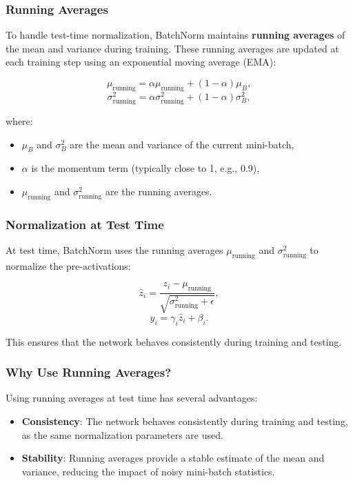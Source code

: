 \begin{notechapter}
\subsubsection{Running Averages}
To handle test-time normalization, BatchNorm maintains
\textbf{running averages}
of the mean and variance during training. These running averages are
updated at each training step using an exponential moving average (EMA):

\[
\mu_{\text{running}} = \alpha \mu_{\text{running}} + (1 - \alpha) \mu_B,
\]
\[
\sigma^2_{\text{running}} = \alpha \sigma^2_{\text{running}} + (1 - \alpha) \sigma_B^2,
\]

where:
\begin{itemize}
    \item \(\mu_B\) and \(\sigma_B^2\) are the mean and variance of the current mini-batch,
    \item \(\alpha\) is the momentum term (typically close to 1, e.g., 0.9),
    \item \(\mu_{\text{running}}\) and \(\sigma^2_{\text{running}}\) are the running averages.
\end{itemize}

\subsubsection{Normalization at Test Time}
At test time, BatchNorm uses the running averages \(\mu_{\text{running}}\) and
\(\sigma^2_{\text{running}}\) to normalize the pre-activations:

\[
\hat{z}_i = \frac{z_i - \mu_{\text{running}}}{\sqrt{\sigma^2_{\text{running}} + \epsilon}},
\]
\[
y_i = \gamma_i \hat{z}_i + \beta_i.
\]

This ensures that the network behaves consistently during training and testing.

\subsubsection{Why Use Running Averages?}
Using running averages at test time has several advantages:
\begin{itemize}
    \item \textbf{Consistency}:
    The network behaves consistently during training and testing, as the
    same normalization parameters are used.

    \item \textbf{Stability}:
    Running averages provide a stable estimate of the mean and variance,
    reducing the impact of noisy mini-batch statistics.


\end{itemize}
\end{notechapter}
